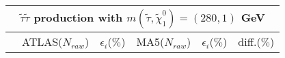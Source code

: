 \documentclass[12pt,A4paper,pdftex, ]{article}
\begin{document}
\begin{table}[h!]
\begin{center}
\begin{tabular}{|c|c|c|c|c|c|}
\hline
\multicolumn{6}{|c|}{ \textbf{$ \tilde{\tau}\tilde{\tau} $ production with $ m(\tilde{\tau},\tilde{\chi}^0_1) = (280,1) $ GeV} }\\
\hline\hline
 & ATLAS($N_{raw}$) & $\epsilon_i$($\%$) & MA5($N_{raw}$) & $\epsilon_i$($\%$) & diff.($\%$) \\
\hline\hline



\end{tabular}
\end{center}
\end{table}
\end{document}
